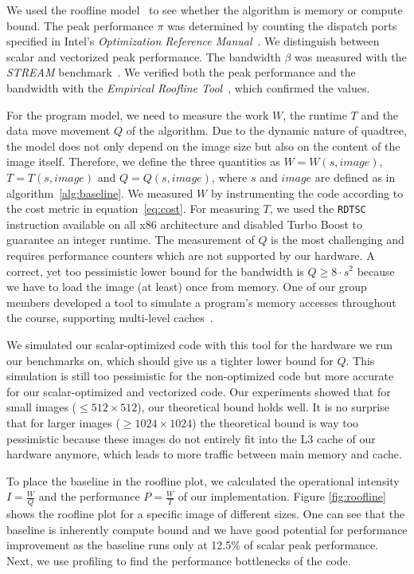  We used the roofline model~\cite{applying-roofline} to see
whether the algorithm is memory or compute bound. The peak performance $\pi$ was
determined by counting the dispatch ports specified in Intel's
\textit{Optimization Reference Manual}~\cite{intel-opt-manual}. We distinguish
between scalar and vectorized peak performance. The bandwidth $\beta$ was
measured with the \textit{STREAM} benchmark~\cite{stream}. We verified both the
peak performance and the bandwidth with the \textit{Empirical Roofline
  Tool}~\cite{ert}, which confirmed the values.

For the program model, we need to measure the work $W$, the runtime $T$ and the
data move movement $Q$ of the algorithm. Due to the dynamic nature of quadtree,
the model does not only depend on the image size but also on the content of the
image itself. Therefore, we define the three quantities as $W=W(s, image)$,
$T=T(s, image)$ and $Q=Q(s, image)$, where $s$ and $image$ are defined as in
algorithm~\ref{alg:baseline}. We measured $W$ by instrumenting the code
according to the cost metric in equation~\eqref{eq:cost}. For measuring $T$, we
used the \texttt{RDTSC} instruction available on all x86 architecture and
disabled Turbo Boost to guarantee an integer runtime. The measurement of $Q$ is
the most challenging and requires performance counters which are not supported
by our hardware. A correct, yet too pessimistic lower bound for the bandwidth is
$Q \geq 8 \cdot s^2$ because we have to load the image (at least) once from
memory. One of our group members developed a tool to simulate a program's memory
accesses throughout the course, supporting multi-level caches~\cite{github-cache}.

We simulated our scalar-optimized code with this tool for the hardware we run our benchmarks on,
which should give us a tighter lower bound for $Q$.
This simulation is still too pessimistic for the non-optimized code but more accurate for our scalar-optimized and vectorized code.
Our experiments showed that for small images ($\leq 512 \times 512$), our theoretical bound holds well.
It is no surprise that for larger images ($\geq 1024 \times 1024$) the theoretical bound is way too pessimistic
because these images do not entirely fit into the L3 cache of our hardware anymore, which leads to more traffic between main memory and cache.

To place the baseline in the roofline plot, we calculated the operational
intensity $I=\frac{W}{Q}$ and the performance $P=\frac{W}{T}$ of our
implementation. Figure \ref{fig:roofline} shows the roofline plot for a specific
image of different sizes. One can see that the baseline is inherently compute
bound and we have good potential for performance improvement as the baseline
runs only at 12.5\% of scalar peak performance. Next, we use profiling to find
the performance bottlenecks of the code.

